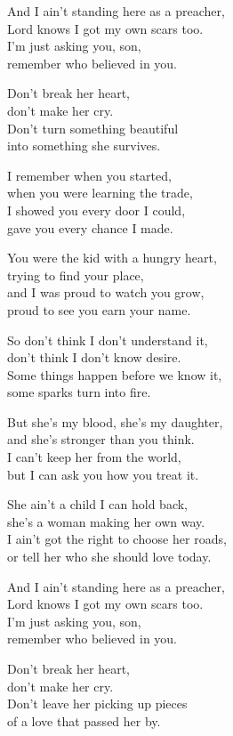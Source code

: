 \begin{lyrics}
And I ain't standing here as a preacher,\\
Lord knows I got my own scars too.\\
I'm just asking you, son,\\
remember who believed in you.

Don't break her heart,\\
don't make her cry.\\
Don't turn something beautiful\\
into something she survives.


I remember when you started,\\
when you were learning the trade,\\
I showed you every door I could,\\
gave you every chance I made.

You were the kid with a hungry heart,\\
trying to find your place,\\
and I was proud to watch you grow,\\
proud to see you earn your name.

So don't think I don't understand it,\\
don't think I don't know desire.\\
Some things happen before we know it,\\
some sparks turn into fire.

But she's my blood, she's my daughter,\\
and she's stronger than you think.\\
I can't keep her from the world,\\
but I can ask you how you treat it.


She ain't a child I can hold back,\\
she's a woman making her own way.\\
I ain't got the right to choose her roads,\\
or tell her who she should love today.

And I ain't standing here as a preacher,\\
Lord knows I got my own scars too.\\
I'm just asking you, son,\\
remember who believed in you.

Don't break her heart,\\
don't make her cry.\\
Don't leave her picking up pieces\\
of a love that passed her by.


\end{lyrics}
